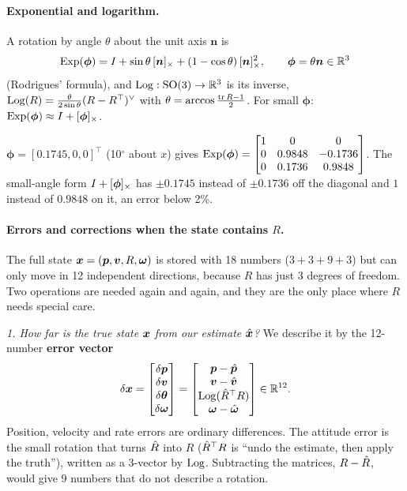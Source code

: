 \paragraph{Exponential and logarithm.} A rotation by angle $\theta$ about the unit axis $\bm n$ is
\begin{equation}
\label{eq:exp}
  \mathrm{Exp}(\bm\phi)=I+\sin\theta\,[\bm n]_{\times}+(1-\cos\theta)\,[\bm n]_{\times}^2,\qquad \bm\phi=\theta\bm n\in\mathbb{R}^3
\end{equation}
(Rodrigues' formula), and $\mathrm{Log}:\mathrm{SO}(3)\to\mathbb{R}^3$ is its inverse, $\mathrm{Log}(R)=\frac{\theta}{2\sin\theta}(R-R^\top)^\vee$
with $\theta=\arccos\frac{\operatorname{tr} R-1}{2}$. For small $\bm\phi$: $\mathrm{Exp}(\bm\phi)\approx I+[\bm\phi]_{\times}$.

\begin{toybox}
$\bm\phi=[0.1745,0,0]^\top$ (10$^\circ$ about $x$) gives
$\mathrm{Exp}(\bm\phi)=\begin{bmatrix}1&0&0\\0&0.9848&-0.1736\\0&0.1736&0.9848\end{bmatrix}$.
The small-angle form $I+[\bm\phi]_{\times}$ has $\pm0.1745$ instead of $\pm0.1736$ off the diagonal and $1$ instead of $0.9848$
on it, an error below 2\%.
\end{toybox}

\paragraph{Errors and corrections when the state contains $R$.} The full state $\bm{x}=(\bm{p},\bm{v},R,\bm{\omega})$ is stored
with 18 numbers ($3+3+9+3$) but can only move in 12 independent directions, because $R$ has just 3 degrees of
freedom. Two operations are needed again and again, and they are the only place where $R$ needs special care.

\emph{1. How far is the true state $\bm{x}$ from our estimate $\hat{\bm x}$?} We describe it by the 12-number
\textbf{error vector}
\begin{equation}
\label{eq:dx}
  \delta\bm{x}=\begin{bmatrix}\delta\bm{p}\\ \delta\bm{v}\\ \delta\bm{\theta}\\ \delta\bm{\omega}\end{bmatrix}
  =\begin{bmatrix}\bm{p}-\hat{\bm p}\\ \bm{v}-\hat{\bm v}\\ \mathrm{Log}(\hat{R}^\top R)\\ \bm{\omega}-\hat{\bm\omega}\end{bmatrix}\in\mathbb{R}^{12}.
\end{equation}
Position, velocity and rate errors are ordinary differences. The attitude error is the small rotation that turns
$\hat{R}$ into $R$ ($\hat{R}^\top R$ is ``undo the estimate, then apply the truth''), written as a 3-vector by $\mathrm{Log}$.
Subtracting the matrices, $R-\hat{R}$, would give 9 numbers that do not describe a rotation.

